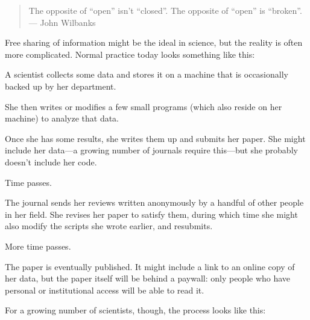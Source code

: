 \documentclass{book}
\begin{document}
\begin{quote}
The opposite of ``open'' isn't ``closed''. The opposite of ``open'' is
``broken''. \\
--- John Wilbanks
\end{quote}

Free sharing of information might be the ideal in science, but the
reality is often more complicated. Normal practice today looks something
like this:

\begin{swcitemize}
\item
  A scientist collects some data and stores it on a machine that is
  occasionally backed up by her department.
\item
  She then writes or modifies a few small programs (which also reside on
  her machine) to analyze that data.
\item
  Once she has some results, she writes them up and submits her paper.
  She might include her data---a growing number of journals require
  this---but she probably doesn't include her code.
\item
  Time passes.
\item
  The journal sends her reviews written anonymously by a handful of
  other people in her field. She revises her paper to satisfy them,
  during which time she might also modify the scripts she wrote earlier,
  and resubmits.
\item
  More time passes.
\item
  The paper is eventually published. It might include a link to an
  online copy of her data, but the paper itself will be behind a
  paywall: only people who have personal or institutional access will be
  able to read it.
\end{swcitemize}

For a growing number of scientists, though, the process looks like this:
\end{document}
